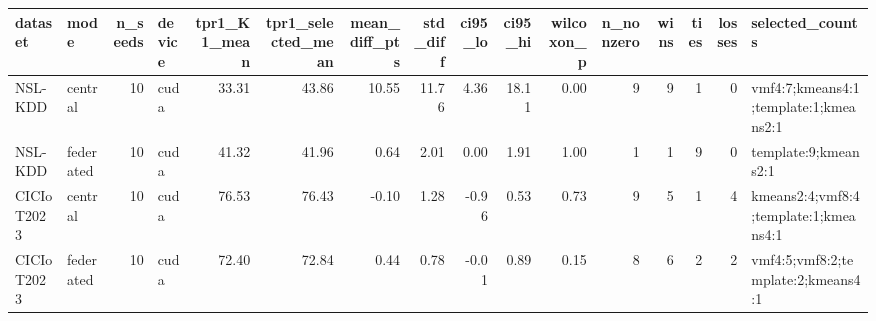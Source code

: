 \begin{tabular}{llrlrrrrrrrrrrrl}
\toprule
dataset & mode & n\_seeds & device & tpr1\_K1\_mean & tpr1\_selected\_mean & mean\_diff\_pts & std\_diff & ci95\_lo & ci95\_hi & wilcoxon\_p & n\_nonzero & wins & ties & losses & selected\_counts \\
\midrule
NSL-KDD & central & 10 & cuda & 33.31 & 43.86 & 10.55 & 11.76 & 4.36 & 18.11 & 0.00 & 9 & 9 & 1 & 0 & vmf4:7;kmeans4:1;template:1;kmeans2:1 \\
NSL-KDD & federated & 10 & cuda & 41.32 & 41.96 & 0.64 & 2.01 & 0.00 & 1.91 & 1.00 & 1 & 1 & 9 & 0 & template:9;kmeans2:1 \\
CICIoT2023 & central & 10 & cuda & 76.53 & 76.43 & -0.10 & 1.28 & -0.96 & 0.53 & 0.73 & 9 & 5 & 1 & 4 & kmeans2:4;vmf8:4;template:1;kmeans4:1 \\
CICIoT2023 & federated & 10 & cuda & 72.40 & 72.84 & 0.44 & 0.78 & -0.01 & 0.89 & 0.15 & 8 & 6 & 2 & 2 & vmf4:5;vmf8:2;template:2;kmeans4:1 \\
\bottomrule
\end{tabular}
